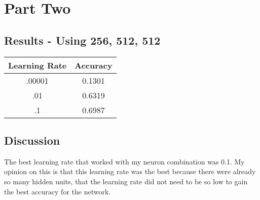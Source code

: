 \documentclass[a4paper]{article}
\begin{document}
\section{Part Two}
\subsection{Results - Using 256, 512, 512}
\begin{table}[h!]
\centering
\begin{tabular}{||c c||} 
 \hline
Learning Rate & Accuracy \\ [0.5ex] 
 \hline\hline
 .00001 & 0.1301 \\ 
 .01 & 0.6319 \\
 .1 & 0.6987 \\
 \hline
\end{tabular}
\label{table:1}
\end{table}

\subsection{Discussion}
The best learning rate that worked with my neuron combination was 0.1. My opinion on this is that this learning rate was the best because there were already so many hidden units, that the learning rate did not need to be so low to gain the best accuracy for the network.
\end{document}
